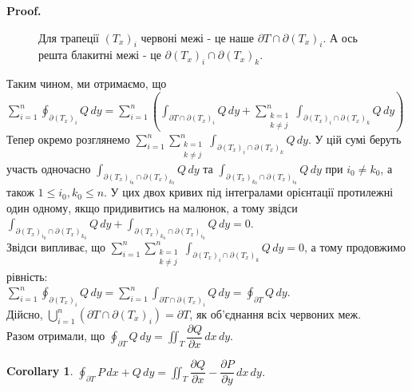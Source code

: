 \documentclass[a4paper, 10pt]{article}
\makeatletter
\def\departial#1#2{\dfrac{\partial {#1}}{\partial {#2}}}
\def\qed{$\blacksquare$}
\theoremstyle{theoremdd}
\theoremstyle{theoremdd}
\theoremstyle{theoremdd}
\theoremstyle{theoremdd}
\theoremstyle{theoremdd}
\theoremstyle{theoremdd}
\theoremstyle{theoremdd}
\theoremstyle{theoremdd}
\newtheorem{corollary}[theorem]{Corollary}
\renewenvironment{proof}[1][Proof.\\]{\par
\pushQED{\hfill \qed}%
\normalfont \topsep6\p@\@plus6\p@\relax
\trivlist
\item\relax
{\bfseries
#1\@addpunct{.}}\hspace\labelsep\ignorespaces
}{%
\popQED\endtrivlist\@endpefalse
}
\makeatother
\begin{document}
\begin{proof}
\begin{figure}[H]
\caption*{Для трапеції $(T_x)_i$ червоні межі - це наше $\partial T \cap \partial (T_x)_i$. А ось решта блакитні межі - це $\partial (T_x)_i \cap \partial (T_x)_k$.}
\end{figure}
Таким чином, ми отримаємо, що\\
$\displaystyle\sum_{i=1}^n \oint_{\partial (T_x)_i} Q\,dy = \sum_{i=1}^n \left( \int_{\partial T \cap \partial (T_x)_i} Q\,dy + \sum_{\substack{k=1 \\ k \neq j}}^n \int_{\partial (T_x)_i \cap \partial (T_x)_k} Q\,dy \right)$\\
Тепер окремо розглянемо $\displaystyle\sum_{i=1}^n \sum_{\substack{k=1 \\ k \neq j}}^n \int_{\partial (T_x)_i \cap \partial (T_x)_k} Q\,dy$. У цій сумі беруть участь одночасно $\displaystyle\int_{\partial(T_x)_{i_0} \cap \partial(T_x)_{k_0}} Q\,dy$ та $\displaystyle\int_{\partial(T_x)_{k_0} \cap \partial(T_x)_{i_0}} Q\,dy$ при $i_0 \neq k_0$, а також $1 \leq i_0,k_0 \leq n$. У цих двох кривих під інтегралами орієнтації протилежні один одному, якщо придивитись на малюнок, а тому звідси\\
$\displaystyle\int_{\partial(T_x)_{i_0} \cap \partial(T_x)_{k_0}} Q\,dy + \int_{\partial(T_x)_{k_0} \cap \partial(T_x)_{i_0}} Q\,dy = 0$.\\
Звідси випливає, що $\displaystyle\sum_{i=1}^n \sum_{\substack{k=1 \\ k \neq j}}^n \int_{\partial (T_x)_i \cap \partial (T_x)_k} Q\,dy = 0$, а тому продовжимо рівність:\\
$\displaystyle\sum_{i=1}^n \oint_{\partial (T_x)_i} Q\,dy = \sum_{i=1}^n \int_{\partial T \cap \partial (T_x)_i} Q\,dy = \oint_{\partial T} Q\,dy$.\\
Дійсно, $\displaystyle\bigcup_{i=1}^n (\partial T \cap \partial (T_x)_i) = \partial T$, як об'єднання всіх червоних меж.\\
Разом отримали, що $\displaystyle\oint_{\partial T}Q\,dy = \iint_T \departial{Q}{x}\,dx\,dy$.
\end{proof}

\begin{corollary}
$\displaystyle\oint_{\partial T} P\,dx + Q\,dy = \iint_T \departial{Q}{x} - \departial{P}{y}\,dx\,dy$.
\end{corollary}
\end{document}
